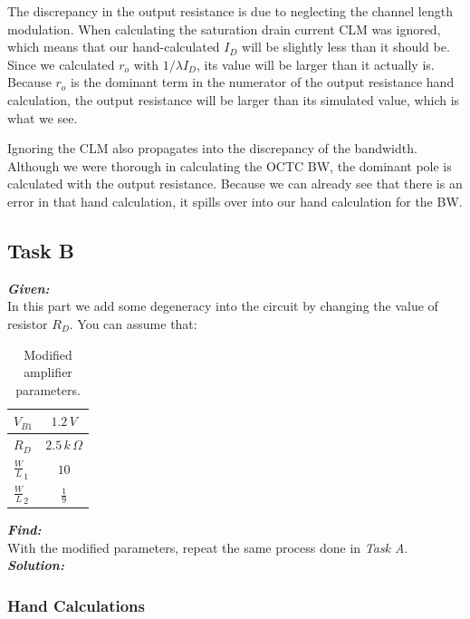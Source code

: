 \documentclass[12pt, fleqn]{article}
\begin{document}
The discrepancy in the output resistance is due to neglecting the channel length modulation.  When calculating the saturation drain current CLM was ignored, which means that our hand-calculated $I_D$ will be slightly less than it should be.  Since we calculated $r_o$ with $1/\lambda I_D$, its value will be larger than it actually is.  Because $r_o$ is the dominant term in the numerator of the output resistance hand calculation, the output resistance will be larger than its simulated value, which is what we see. 

Ignoring the CLM also propagates into the discrepancy of the bandwidth.  Although we were thorough in calculating the OCTC BW, the dominant pole is calculated with the output resistance.  Because we can already see that there is an error in that hand calculation, it spills over into our hand calculation for the BW.
\newpage
\subsection{Task B}
\textbf{\emph{Given: }}\\[0.25cm]
\noindent
In this part we add some degeneracy into the circuit by changing the value of resistor $R_D$. You can assume that:\\[0.25cm]
\begin{table}[H]
\centering
\setlength{\tabcolsep}{20pt}
\renewcommand{\arraystretch}{1.5}
\begin{tabular}{|l|c|}
    \hline
    $V_{B1}$ & $1.2\,V$\\
    \hline
    $R_D$ & $2.5\,k\,\Omega$\\
    \hline
    $\frac{W}{L}_1$ & $10$\\
    \hline
    $\frac{W}{L}_2$ & $\frac{1}{9}$\\
    \hline
\end{tabular}
\caption{Modified amplifier parameters.
\label{tab:amp_param2}} 
\end{table}
\noindent
\textbf{\emph{Find: }}\\[0.25cm]\noindent
With the modified parameters, repeat the same process done in \textit{Task A}.\\[0.25cm]
\newpage\noindent
\textbf{\emph{Solution: }}
\subsubsection{Hand Calculations}
\end{document}
